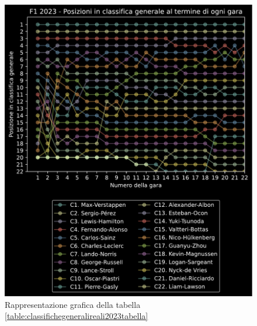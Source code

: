 \documentclass[12pt,a4paper,openright,twoside]{book}
\begin{document}
\begin{figure}[H]
    \centering
     \includegraphics[width=\linewidth]{figures/realstandings2023.pdf}
     \caption{Rappresentazione grafica della tabella \ref{table:classifichegeneralireali2023tabella} }
     \label{fig:classifichegeneralireali2023figura}
 \end{figure}
\end{document}
